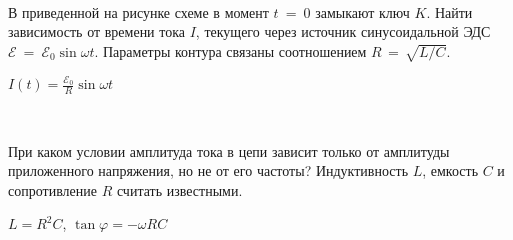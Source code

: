 \begin{ex}
\hspace{0pt} \\
\begin{minipage}{.65\textwidth}
В приведенной на рисунке схеме в момент $t$~=~0 замыкают ключ $K$. Найти зависимость от времени тока $I$, текущего через источник синусоидальной ЭДС $\mathcal{E}~=~\mathcal{E}_0 \sin \omega t$.
Параметры контура связаны соотношением $R\,=\,\sqrt{L/C}$.
\end{minipage}
\begin{minipage}{.35\textwidth}
\centering

\end{minipage}
\begin{ans}
$I(t) = \frac{\mathcal{E}_0}{R} \sin \omega t$
\end{ans}
\end{ex}

\begin{ex}
\hspace{0pt} \\
\begin{minipage}{.65\textwidth}
При каком условии амплитуда тока в цепи зависит только от амплитуды приложенного напряжения, но не от его частоты? Индуктивность $L$, емкость $C$ и сопротивление $R$ считать известными.
\end{minipage}
\begin{minipage}{.35\textwidth}
\centering

\end{minipage}
\begin{ans}
$L=R^2C$, $\tan \varphi = -\omega RC$
\end{ans}
\end{ex}